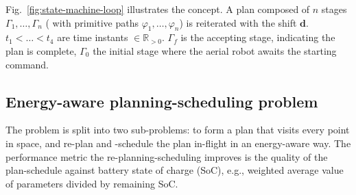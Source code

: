 \documentclass[letterpaper,10pt,journal,twoside]{IEEEtran}
\theoremstyle{definition}
\begin{document}

Fig.~\ref{fig:state-machine-loop} illustrates the concept. %
A plan composed of $n$ stages $\Gamma_1,\dots,\Gamma_n$ (%
{\color{blue}with }primitive paths $\varphi_1,\dots,\varphi_n$) is reiterated with the shift $\mathbf{d}$. $t_1<\dots<t_4$ are time instants $\in\mathbb{R}_{> 0}$. $\Gamma_f$ is the accepting stage, indicating the plan is complete, $\Gamma_0$ the initial stage where the aerial robot awaits the starting command.

\subsection{Energy-aware planning-scheduling problem}
\label{sec:pbfor}

The problem %
is {\color{blue}split into }%
two sub-problems{\color{blue}: }%
to form a %
plan that visits every point in space, {\color{blue}and }%
re-plan and -schedule the plan in-flight in an energy-aware way. %
{\color{blue} The performance metric the re-planning-scheduling %
improves is %
the quality of the plan-schedule against battery state of charge (SoC), e.g., weighted average value of parameters divided by remaining %
SoC.%
}
\end{document}

